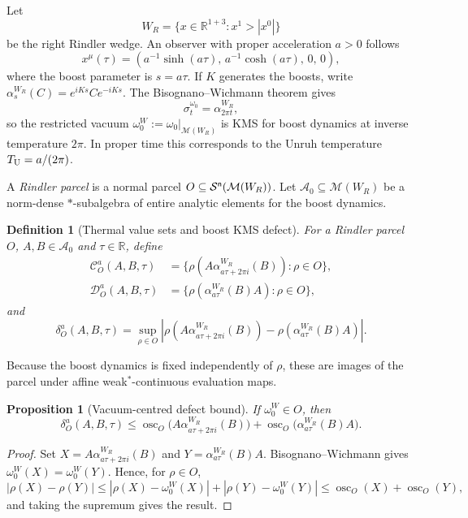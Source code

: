 \documentclass[11pt]{article}
\newtheorem{definition}[theorem]{Definition}
\newtheorem{proposition}[theorem]{Proposition}
\begin{document}
Let
\[
W_R=\{x\in\mathbb R^{1+3}:x^1>|x^0|\}
\]
be the right Rindler wedge. An observer with proper acceleration $a>0$
follows
\[
x^\mu(\tau)
=
\left(
a^{-1}\sinh(a\tau),\,
a^{-1}\cosh(a\tau),\,0,\,0
\right),
\]
where the boost parameter is $s=a\tau$. If $K$ generates the boosts, write
$\alpha_s^{W_R}(C)=e^{iKs}Ce^{-iKs}$. The Bisognano--Wichmann theorem gives
\[
\sigma_t^{\omega_0}
=
\alpha_{2\pi t}^{W_R},
\]
so the restricted vacuum
$\omega_0^W:=\omega_0|_{\mathcal M(W_R)}$ is KMS for boost dynamics at
inverse temperature $2\pi$. In proper time this corresponds to the Unruh
temperature $T_{\rm U}=a/(2\pi)$.

A \emph{Rindler parcel} is a normal parcel
$O\subseteq\mathcal S^{\sf n}(\mathcal M(W_R))$. Let
$\mathcal A_0\subseteq\mathcal M(W_R)$ be a norm-dense $*$-subalgebra of
entire analytic elements for the boost dynamics.

\begin{definition}[Thermal value sets and boost KMS defect]
\label{def:boostkmsdefect}
For a Rindler parcel $O$, $A,B\in\mathcal A_0$ and $\tau\in\mathbb R$,
define
\[
\begin{aligned}
\mathcal C_O^a(A,B,\tau)
&=
\{\rho(A\alpha^{W_R}_{a\tau+2\pi i}(B)):\rho\in O\},\\
\mathcal D_O^a(A,B,\tau)
&=
\{\rho(\alpha^{W_R}_{a\tau}(B)A):\rho\in O\},
\end{aligned}
\]
and
\[
\delta_O^a(A,B,\tau)
=
\sup_{\rho\in O}
\left|
\rho(A\alpha^{W_R}_{a\tau+2\pi i}(B))
-
\rho(\alpha^{W_R}_{a\tau}(B)A)
\right|.
\]
\end{definition}

Because the boost dynamics is fixed independently of $\rho$, these are
images of the parcel under affine weak$^*$-continuous evaluation maps.

\begin{proposition}[Vacuum-centred defect bound]
\label{prop:oscillationboundsboost}
If $\omega_0^W\in O$, then
\[
\delta_O^a(A,B,\tau)
\leq
\operatorname{osc}_O
\bigl(A\alpha^{W_R}_{a\tau+2\pi i}(B)\bigr)
+
\operatorname{osc}_O
\bigl(\alpha^{W_R}_{a\tau}(B)A\bigr).
\]
\end{proposition}

\begin{proof}
Set
$X=A\alpha^{W_R}_{a\tau+2\pi i}(B)$ and
$Y=\alpha^{W_R}_{a\tau}(B)A$. Bisognano--Wichmann gives
$\omega_0^W(X)=\omega_0^W(Y)$. Hence, for $\rho\in O$,
\[
|\rho(X)-\rho(Y)|
\leq
|\rho(X)-\omega_0^W(X)|
+
|\rho(Y)-\omega_0^W(Y)|
\leq
\operatorname{osc}_O(X)+\operatorname{osc}_O(Y),
\]
and taking the supremum gives the result.
\end{proof}
\end{document}
